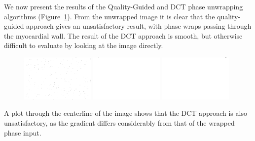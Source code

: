 We now present the results of the Quality-Guided and DCT phase unwrapping algorithms (Figure~\ref{fig:HARP_Unwrap}).  From the unwrapped image it is clear that the quality-guided approach gives an unsatisfactory result, with phase wraps passing through the myocardial wall.  The result of the DCT approach is smooth, but otherwise difficult to evaluate by looking at the image directly.

\begin{figure}[h]
\center
\includegraphics[trim = 100px 50px 110px 30px, clip, width=0.32\textwidth]{images/input/wrapped_harp.png}
\includegraphics[trim = 100px 50px 110px 30px, clip, width=0.32\textwidth]{images/harp/03e_qg_unwrap.png}
\includegraphics[trim = 100px 50px 110px 30px, clip, width=0.32\textwidth]{images/harp/03f_dct_unwrap.png}

\label{fig:HARP_Unwrap}
\end{figure}

A plot through the centerline of the image shows that the DCT approach is also unsatisfactory, as the gradient differs considerably from that of the wrapped phase input.

